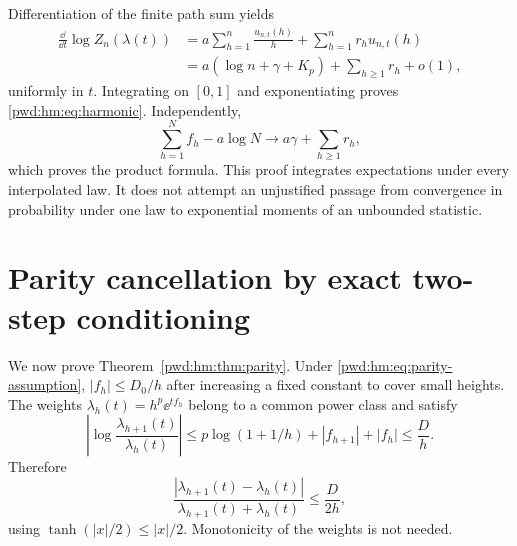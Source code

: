\documentclass[11pt,letterpaper]{article}
\numberwithin{equation}{section}
\theoremstyle{remark}\newtheorem{remark}[theorem]{Remark}
\begin{document}
Differentiation of the finite path sum yields
\begin{align*}
 \frac{\dd}{\dd t}\log Z_n(\lambda(t))
 &=a\sum_{h=1}^n\frac{u_{n,t}(h)}h+\sum_{h=1}^nr_hu_{n,t}(h)\\
 &=a(\log n+\gamma+K_p)+\sum_{h\ge1}r_h+o(1),
\end{align*}
uniformly in $t$. Integrating on $[0,1]$ and exponentiating proves \eqref{pwd:hm:eq:harmonic}. Independently,
\[
 \sum_{h=1}^Nf_h-a\log N\longrightarrow a\gamma+\sum_{h\ge1}r_h,
\]
which proves the product formula. This proof integrates expectations under every interpolated law. It does not attempt an unjustified passage from convergence in probability under one law to exponential moments of an unbounded statistic.

\section{Parity cancellation by exact two-step conditioning}\label{pwd:hm:sec:parity-proof}
We now prove Theorem~\ref{pwd:hm:thm:parity}. Under \eqref{pwd:hm:eq:parity-assumption}, $|f_h|\le D_0/h$ after increasing a fixed constant to cover small heights. The weights $\lambda_h(t)=h^p\ee^{tf_h}$ belong to a common power class and satisfy
\begin{equation}\label{pwd:hm:eq:adjacent}
 \left|\log\frac{\lambda_{h+1}(t)}{\lambda_h(t)}\right|
 \le p\log(1+1/h)+|f_{h+1}|+|f_h|\le\frac Dh.
\end{equation}
Therefore
\begin{equation}\label{pwd:hm:eq:adjacent-difference}
 \frac{|\lambda_{h+1}(t)-\lambda_h(t)|}{\lambda_{h+1}(t)+\lambda_h(t)}
 \le\frac D{2h},
\end{equation}
using $\tanh(|x|/2)\le|x|/2$. Monotonicity of the weights is not needed.
\end{document}

